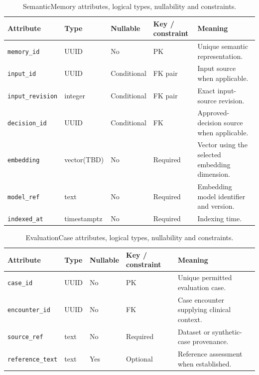 \begin{table}[htbp]
\setlength{\tabcolsep}{5pt}
\centering
\small
\caption{SemanticMemory attributes, logical types, nullability and constraints.}
\label{tab:kashaf:dict-semanticmemory}
\begin{tabular}{|p{}|p{}|p{}|p{}|p{}|}
\hline
Attribute & Type & Nullable & Key / constraint & Meaning \\ \hline
\texttt{memory\_id} & UUID & No & PK & Unique semantic representation. \\ \hline
\texttt{input\_id} & UUID & Conditional & FK pair & Input source when applicable. \\ \hline
\texttt{input\_revision} & integer & Conditional & FK pair & Exact input-source revision. \\ \hline
\texttt{decision\_id} & UUID & Conditional & FK & Approved-decision source when applicable. \\ \hline
\texttt{embedding} & vector(TBD) & No & Required & Vector using the selected embedding dimension. \\ \hline
\texttt{model\_ref} & text & No & Required & Embedding model identifier and version. \\ \hline
\texttt{indexed\_at} & timestamptz & No & Required & Indexing time. \\ \hline
\end{tabular}
\end{table}

\begin{table}[htbp]
\setlength{\tabcolsep}{5pt}
\centering
\small
\caption{EvaluationCase attributes, logical types, nullability and constraints.}
\label{tab:kashaf:dict-evaluationcase}
\begin{tabular}{|p{}|p{}|p{}|p{}|p{}|}
\hline
Attribute & Type & Nullable & Key / constraint & Meaning \\ \hline
\texttt{case\_id} & UUID & No & PK & Unique permitted evaluation case. \\ \hline
\texttt{encounter\_id} & UUID & No & FK & Case encounter supplying clinical context. \\ \hline
\texttt{source\_ref} & text & No & Required & Dataset or synthetic-case provenance. \\ \hline
\texttt{reference\_text} & text & Yes & Optional & Reference assessment when established. \\ \hline
\end{tabular}
\end{table}

